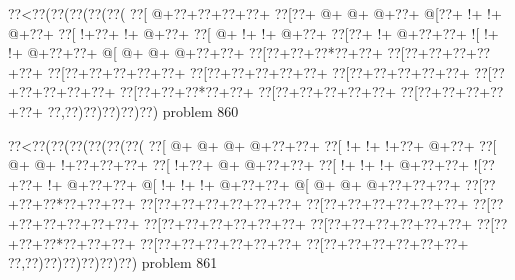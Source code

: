 \vbox{\vbox{\goo
\0??<\0??(\0??(\0??(\0??(\0??(
\0??[\- @+\0??+\0??+\0??+\0??+
\0??[\0??+\- @+\- @+\- @+\0??+
\- @[\0??+\- !+\- !+\- @+\0??+
\0??[\- !+\0??+\- !+\- @+\0??+
\0??[\- @+\- !+\- !+\- @+\0??+
\0??[\0??+\- !+\- @+\0??+\0??+
\- ![\- !+\- !+\- @+\0??+\0??+
\- @[\- @+\- @+\- @+\0??+\0??+
\0??[\0??+\0??+\0??*\0??+\0??+
\0??[\0??+\0??+\0??+\0??+\0??+
\0??[\0??+\0??+\0??+\0??+\0??+
\0??[\0??+\0??+\0??+\0??+\0??+
\0??[\0??+\0??+\0??+\0??+\0??+
\0??[\0??+\0??+\0??+\0??+\0??+
\0??[\0??+\0??+\0??*\0??+\0??+
\0??[\0??+\0??+\0??+\0??+\0??+
\0??[\0??+\0??+\0??+\0??+\0??+
\0??,\0??)\0??)\0??)\0??)\0??)
}
\hfil problem 860\hfil\break
}

\vbox{\vbox{\goo
\0??<\0??(\0??(\0??(\0??(\0??(\0??(
\0??[\- @+\- @+\- @+\- @+\0??+\0??+
\0??[\- !+\- !+\- !+\0??+\- @+\0??+
\0??[\- @+\- @+\- !+\0??+\0??+\0??+
\0??[\- !+\0??+\- @+\- @+\0??+\0??+
\0??[\- !+\- !+\- !+\- @+\0??+\0??+
\- ![\0??+\0??+\- !+\- @+\0??+\0??+
\- @[\- !+\- !+\- !+\- @+\0??+\0??+
\- @[\- @+\- @+\- @+\0??+\0??+\0??+
\0??[\0??+\0??+\0??*\0??+\0??+\0??+
\0??[\0??+\0??+\0??+\0??+\0??+\0??+
\0??[\0??+\0??+\0??+\0??+\0??+\0??+
\0??[\0??+\0??+\0??+\0??+\0??+\0??+
\0??[\0??+\0??+\0??+\0??+\0??+\0??+
\0??[\0??+\0??+\0??+\0??+\0??+\0??+
\0??[\0??+\0??+\0??*\0??+\0??+\0??+
\0??[\0??+\0??+\0??+\0??+\0??+\0??+
\0??[\0??+\0??+\0??+\0??+\0??+\0??+
\0??,\0??)\0??)\0??)\0??)\0??)\0??)
}
\hfil problem 861\hfil\break
}
